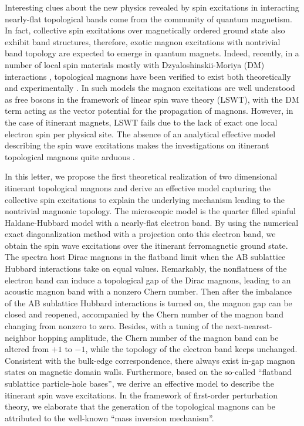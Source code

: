 \documentclass[amsmath,superscriptaddress,showpacs,aps,prl,twocolumn]{revtex4-1}
\begin{document}
\par Interesting clues about the new physics revealed by spin excitations in interacting nearly-flat topological bands come from the community of quantum magnetism. In fact, collective spin excitations over magnetically ordered ground state also exhibit band structures, therefore, exotic magnon excitations with nontrivial band topology are expected to emerge in quantum magnets. Indeed, recently, in a number of local spin materials mostly with Dzyaloshinskii-Moriya (DM) interactions \cite{Dzyaloshinsky_JPCS1958,Moriya_PR1960}, topological magnons have been verified to exist both theoretically \cite{Zhang_PRB2013,Owerre_JPCM2016,Li_NC2016,Mook_PRL2016,Laurell_PRL2017} and experimentally \cite{Onose_S2010,Chisnell_PRL2015,Yao_NP2018,Bao_NC2018}. In such models the magnon excitations are well understood as free bosons in the framework of linear spin wave theory (LSWT), with the DM term acting as the vector potential for the propagation of magnons. However, in the case of itinerant magnets, LSWT fails due to the lack of exact one local electron spin per physical site. The absence of an analytical effective model describing the spin wave excitations makes the investigations on itinerant topological magnons quite arduous \cite{Su_PRB2018}.

\par In this letter, we propose the first theoretical realization of two dimensional itinerant topological magnons and derive an effective model capturing the collective spin excitations to explain the underlying mechanism leading to the nontrivial magnonic topology. The microscopic model is the quarter filled spinful Haldane-Hubbard model with a nearly-flat electron band. By using the numerical exact diagonalization method with a projection onto this electron band, we obtain the spin wave excitations over the itinerant ferromagnetic ground state. The spectra host Dirac magnons in the flatband limit when the AB sublattice Hubbard interactions take on equal values. Remarkably, the nonflatness of the electron band can induce a topological gap of the Dirac magnons, leading to an acoustic magnon band with a nonzero Chern number. Then after the imbalance of the AB sublattice Hubbard interactions is turned on, the magnon gap can be closed and reopened, accompanied by the Chern number of the magnon band changing from nonzero to zero. Besides, with a tuning of the next-nearest-neighbor hopping amplitude, the Chern number of the magnon band can be altered from $+1$ to $-1$, while the topology of the electron band keeps unchanged. Consistent with the bulk-edge correspondence, there always exist in-gap magnon states on magnetic domain walls. Furthermore, based on the so-called ``flatband sublattice particle-hole bases'', we derive an effective model to describe the itinerant spin wave excitations. In the framework of first-order perturbation theory, we elaborate that the generation of the topological magnons can be attributed to the well-known ``mass inversion mechanism''.
\end{document}
